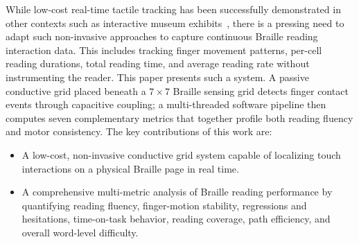 \documentclass[conference]{IEEEtran}
\begin{document}
    While low-cost real-time tactile tracking has been successfully demonstrated in other contexts such as interactive museum exhibits~\cite{ajay-tactile1, ajay-tactile2}, there is a pressing need to adapt such non-invasive approaches to capture continuous Braille reading interaction data. This includes tracking finger movement patterns, per-cell reading durations, total reading time, and average reading rate without instrumenting the reader.
    This paper presents such a system. A passive conductive grid placed
    beneath a $7\times7$ Braille sensing grid detects finger contact
    events through capacitive coupling; a multi-threaded software pipeline
    then computes seven complementary metrics that together profile both
    reading fluency and motor consistency. The key contributions of this
    work are:

    \begin{itemize}
        \item A low-cost, non-invasive conductive grid system capable of
            localizing touch interactions on a physical Braille page in
            real time.

        \item 
        A comprehensive multi-metric analysis of Braille reading performance by quantifying reading fluency, finger-motion stability, regressions and hesitations, time-on-task behavior, reading coverage, path efficiency, and overall word-level difficulty.
        





    \end{itemize}
\end{document}
